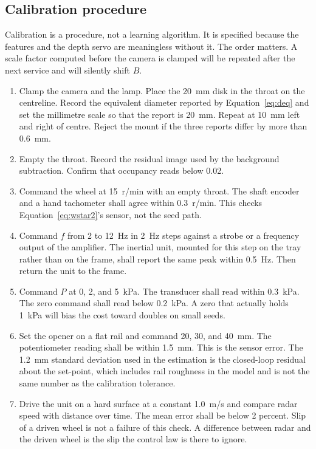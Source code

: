 \subsection{Calibration procedure}

Calibration is a procedure, not a learning algorithm. It is specified because the features and the depth servo are meaningless without it. The order matters. A scale factor computed before the camera is clamped will be repeated after the next service and will silently shift $B$.

\begin{enumerate}
\item Clamp the camera and the lamp. Place the 20~mm disk in the throat on the centreline. Record the equivalent diameter reported by Equation~\eqref{eq:deq} and set the millimetre scale so that the report is 20~mm. Repeat at 10~mm left and right of centre. Reject the mount if the three reports differ by more than 0.6~mm.
\item Empty the throat. Record the residual image used by the background subtraction. Confirm that occupancy reads below 0.02.
\item Command the wheel at 15~r/min with an empty throat. The shaft encoder and a hand tachometer shall agree within 0.3~r/min. This checks Equation~\eqref{eq:wstar2}'s sensor, not the seed path.
\item Command $f$ from 2 to 12~Hz in 2~Hz steps against a strobe or a frequency output of the amplifier. The inertial unit, mounted for this step on the tray rather than on the frame, shall report the same peak within 0.5~Hz. Then return the unit to the frame.
\item Command $P$ at 0, 2, and 5~kPa. The transducer shall read within 0.3~kPa. The zero command shall read below 0.2~kPa. A zero that actually holds 1~kPa will bias the cost toward doubles on small seeds.
\item Set the opener on a flat rail and command 20, 30, and 40~mm. The potentiometer reading shall be within 1.5~mm. This is the sensor error. The 1.2~mm standard deviation used in the estimation is the closed-loop residual about the set-point, which includes rail roughness in the model and is not the same number as the calibration tolerance.
\item Drive the unit on a hard surface at a constant 1.0~m/s and compare radar speed with distance over time. The mean error shall be below 2 percent. Slip of a driven wheel is not a failure of this check. A difference between radar and the driven wheel is the slip the control law is there to ignore.
\end{enumerate}

